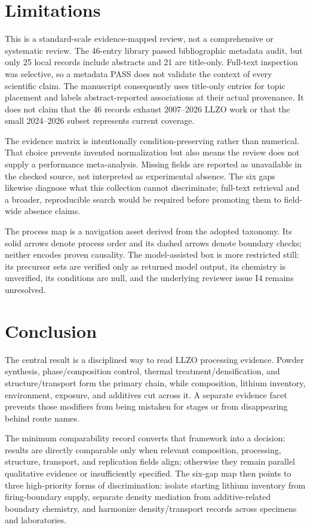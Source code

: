 \section{Limitations}

This is a standard-scale evidence-mapped review, not a comprehensive or systematic review. The 46-entry library passed bibliographic metadata audit, but only 25 local records include abstracts and 21 are title-only. Full-text inspection was selective, so a metadata PASS does not validate the context of every scientific claim. The manuscript consequently uses title-only entries for topic placement and labels abstract-reported associations at their actual provenance. It does not claim that the 46 records exhaust 2007--2026 LLZO work or that the small 2024--2026 subset represents current coverage.

The evidence matrix is intentionally condition-preserving rather than numerical. That choice prevents invented normalization but also means the review does not supply a performance meta-analysis. Missing fields are reported as unavailable in the checked source, not interpreted as experimental absence. The six gaps likewise diagnose what this collection cannot discriminate; full-text retrieval and a broader, reproducible search would be required before promoting them to field-wide absence claims.

The process map is a navigation asset derived from the adopted taxonomy. Its solid arrows denote process order and its dashed arrows denote boundary checks; neither encodes proven causality. The model-assisted box is more restricted still: its precursor sets are verified only as returned model output, its chemistry is unverified, its conditions are null, and the underlying reviewer issue I4 remains unresolved.

\section{Conclusion}

The central result is a disciplined way to read LLZO processing evidence. Powder synthesis, phase/composition control, thermal treatment/densification, and structure/transport form the primary chain, while composition, lithium inventory, environment, exposure, and additives cut across it. A separate evidence facet prevents those modifiers from being mistaken for stages or from disappearing behind route names.

The minimum comparability record converts that framework into a decision: results are directly comparable only when relevant composition, processing, structure, transport, and replication fields align; otherwise they remain parallel qualitative evidence or insufficiently specified. The six-gap map then points to three high-priority forms of discrimination: isolate starting lithium inventory from firing-boundary supply, separate density mediation from additive-related boundary chemistry, and harmonize density/transport records across specimens and laboratories.

